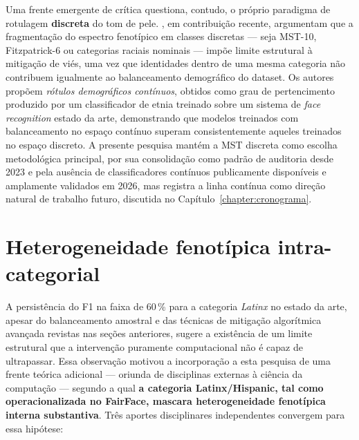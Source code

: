 Uma frente emergente de crítica questiona, contudo, o próprio paradigma de rotulagem \textbf{discreta} do tom de pele. , em contribuição recente, argumentam que a fragmentação do espectro fenotípico em classes discretas --- seja MST-10, Fitzpatrick-6 ou categorias raciais nominais --- impõe limite estrutural à mitigação de viés, uma vez que identidades dentro de uma mesma categoria não contribuem igualmente ao balanceamento demográfico do dataset. Os autores propõem \emph{rótulos demográficos contínuos}, obtidos como grau de pertencimento produzido por um classificador de etnia treinado sobre um sistema de \emph{face recognition} estado da arte, demonstrando que modelos treinados com balanceamento no espaço contínuo superam consistentemente aqueles treinados no espaço discreto. A presente pesquisa mantém a MST discreta como escolha metodológica principal, por sua consolidação como padrão de auditoria desde 2023 e pela ausência de classificadores contínuos publicamente disponíveis e amplamente validados em 2026, mas registra a linha contínua como direção natural de trabalho futuro, discutida no Capítulo~\ref{chapter:cronograma}.


\section{Heterogeneidade fenotípica intra-categorial}
\label{sec:rl_latinx}

A persistência do F1 na faixa de 60\,\% para a categoria \emph{Latinx} no estado da arte, apesar do balanceamento amostral e das técnicas de mitigação algorítmica avançada revistas nas seções anteriores, sugere a existência de um limite estrutural que a intervenção puramente computacional não é capaz de ultrapassar. Essa observação motivou a incorporação a esta pesquisa de uma frente teórica adicional --- oriunda de disciplinas externas à ciência da computação --- segundo a qual \textbf{a categoria Latinx/Hispanic, tal como operacionalizada no FairFace, mascara heterogeneidade fenotípica interna substantiva}. Três aportes disciplinares independentes convergem para essa hipótese:


